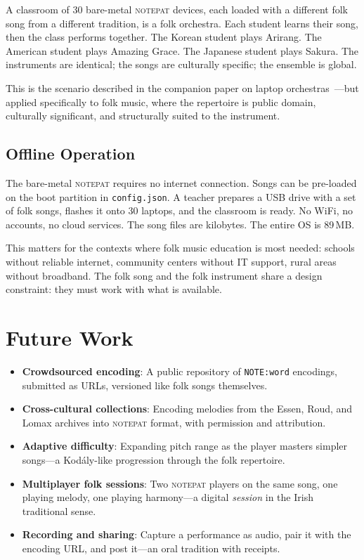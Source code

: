 \documentclass[10pt,letterpaper,twocolumn]{article}
\newcommand{\np}{\textsc{notepat}}
\begin{document}
A classroom of 30 bare-metal \np{} devices, each loaded with a different folk song from a different tradition, is a folk orchestra. Each student learns their song, then the class performs together. The Korean student plays Arirang. The American student plays Amazing Grace. The Japanese student plays Sakura. The instruments are identical; the songs are culturally specific; the ensemble is global.

This is the scenario described in the companion paper on laptop orchestras~\citep{scudder2026plork}---but applied specifically to folk music, where the repertoire is public domain, culturally significant, and structurally suited to the instrument.

\subsection{Offline Operation}

The bare-metal \np{} requires no internet connection. Songs can be pre-loaded on the boot partition in \texttt{config.json}. A teacher prepares a USB drive with a set of folk songs, flashes it onto 30 laptops, and the classroom is ready. No WiFi, no accounts, no cloud services. The song files are kilobytes. The entire OS is 89\,MB.

This matters for the contexts where folk music education is most needed: schools without reliable internet, community centers without IT support, rural areas without broadband. The folk song and the folk instrument share a design constraint: they must work with what is available.

\section{Future Work}

\begin{itemize}
  \item \textbf{Crowdsourced encoding}: A public repository of \texttt{NOTE:word} encodings, submitted as URLs, versioned like folk songs themselves.
  \item \textbf{Cross-cultural collections}: Encoding melodies from the Essen, Roud, and Lomax archives into \np{} format, with permission and attribution.
  \item \textbf{Adaptive difficulty}: Expanding pitch range as the player masters simpler songs---a Kod\'aly-like progression through the folk repertoire.
  \item \textbf{Multiplayer folk sessions}: Two \np{} players on the same song, one playing melody, one playing harmony---a digital \textit{session} in the Irish traditional sense.
  \item \textbf{Recording and sharing}: Capture a performance as audio, pair it with the encoding URL, and post it---an oral tradition with receipts.
\end{itemize}
\end{document}
